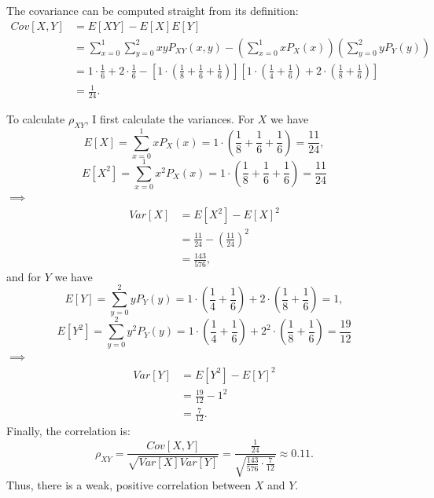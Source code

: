 \begin{problem}{31} The covariance can be computed straight from its definition:
\begin{align*}
Cov[X, Y] &= E[XY] -E[X]E[Y] \\
&= \sum_{x=0}^1 \sum_{y=0}^2 xy P_{XY}(x, y)-\left(\sum_{x=0}^1x P_X(x) \right) \left(  \sum_{y=0}^2y P_Y(y) \right) \\
& = 1\cdot \frac{1}{6}+2\cdot \frac{1}{6} -\left[1\cdot \left(\frac{1}{8}+\frac{1}{6}+\frac{1}{6}\right)\right]\left[1\cdot \left(\frac{1}{4}+\frac{1}{6}\right)+2\cdot \left(\frac{1}{8}+\frac{1}{6}\right) \right] \\
& = \frac{1}{24}.
\end{align*}

To calculate $\rho_{XY}$, I first calculate the variances.  For $X$ we have
\begin{equation*}
E[X] = \sum_{x=0}^1xP_X(x) = 1 \cdot \left (\frac{1}{8}+\frac{1}{6}+\frac{1}{6}\right) = \frac{11}{24},
\end{equation*}
\begin{equation*}
E[X^2] = \sum_{x=0}^1x^2P_X(x) = 1 \cdot \left (\frac{1}{8}+\frac{1}{6}+\frac{1}{6}\right) = \frac{11}{24} 
\end{equation*}
$\implies$
\begin{align*}
Var[X] &=E[X^2]-E[X]^2 \\
&=\frac{11}{24}- \left(\frac{11}{24} \right)^2 \\
&=\frac{143}{576},
\end{align*}
and for $Y$ we have
\begin{equation*}
E[Y] = \sum_{y=0}^2yP_Y(y) = 1 \cdot \left  (\frac{1}{4}+\frac{1}{6}\right)+2 \cdot \left (\frac{1}{8}+\frac{1}{6}\right) = 1,
\end{equation*}
\begin{equation*}
E[Y^2] = \sum_{y=0}^2y^2P_Y(y) = 1 \cdot \left (\frac{1}{4}+\frac{1}{6} \right)+2^2 \cdot \left (\frac{1}{8}+\frac{1}{6}\right) = \frac{19}{12}
\end{equation*}
$\implies$
\begin{align*}
Var[Y] &=E[Y^2]-E[Y]^2 \\
&=\frac{19}{12}- 1^2 \\
&=\frac{7}{12}.
\end{align*}
Finally, the correlation is:
\begin{equation}
\rho_{XY} = \frac{Cov[X, Y] }{\sqrt{Var[X] Var[Y]}} = \frac{\frac{1}{24}}{\sqrt{\frac{143}{576} \cdot \frac{7}{12}}} \approx 0.11.
\end{equation}
Thus, there is a weak, positive correlation between $X$ and $Y$.

\end{problem}

